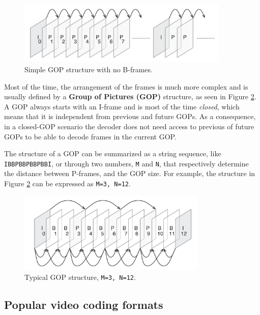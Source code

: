 \begin{figure}[h]
	\centering
	
	\includegraphics[width=0.9\textwidth]{res/gop1.png}
	
	\caption{Simple GOP structure with no B-frames.\cite{h264}}
	\label{fig:codec_gop1}
\end{figure}

Most of the time, the arrangement of the frames is much more complex and is usually defined by a \textbf{Group of Pictures (GOP)} structure, as seen in Figure \ref{fig:codec_gop2}. A GOP always starts with an I-frame and is most of the time \textit{closed}, which means that it is independent from previous and future GOPs. As a consequence, in a closed-GOP scenario the decoder does not need access to previous of future GOPs to be able to decode frames in the current GOP.

The structure of a GOP can be summarized as a string sequence, like \texttt{IBBPBBPBBPBBI}, or through two numbers, \texttt{M} and \texttt{N}, that respectively determine the distance between P-frames, and the GOP size. For example, the structure in Figure \ref{fig:codec_gop2} can be expressed as \texttt{M=3, N=12}.

\begin{figure}[h]
	\centering
	
	\includegraphics[width=0.8\textwidth]{res/gop2.png}
	
	\caption{Typical GOP structure, \texttt{M=3, N=12}.\cite{h264}}
	\label{fig:codec_gop2}
\end{figure}

\subsection{Popular video coding formats}
\label{sec:bg/compression/codecs}

